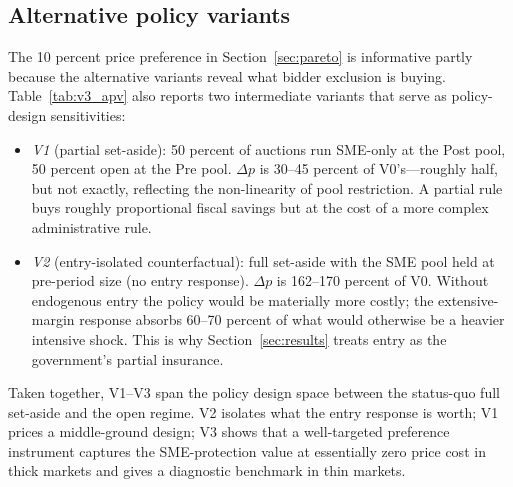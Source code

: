 \subsection{Alternative policy variants}

The 10 percent price preference in Section~\ref{sec:pareto} is informative partly because the alternative variants reveal what bidder exclusion is buying. Table~\ref{tab:v3_apv} also reports two intermediate variants that serve as policy-design sensitivities:

\begin{itemize}
\item \emph{V1} (partial set-aside): 50 percent of auctions run SME-only at the Post pool, 50 percent open at the Pre pool. $\Delta p$ is 30--45 percent of V0's---roughly half, but not exactly, reflecting the non-linearity of pool restriction. A partial rule buys roughly proportional fiscal savings but at the cost of a more complex administrative rule.
\item \emph{V2} (entry-isolated counterfactual): full set-aside with the SME pool held at pre-period size (no entry response). $\Delta p$ is 162--170 percent of V0. Without endogenous entry the policy would be materially more costly; the extensive-margin response absorbs 60--70 percent of what would otherwise be a heavier intensive shock. This is why Section~\ref{sec:results} treats entry as the government's partial insurance.
\end{itemize}

Taken together, V1--V3 span the policy design space between the status-quo full set-aside and the open regime. V2 isolates what the entry response is worth; V1 prices a middle-ground design; V3 shows that a well-targeted preference instrument captures the SME-protection value at essentially zero price cost in thick markets and gives a diagnostic benchmark in thin markets.

